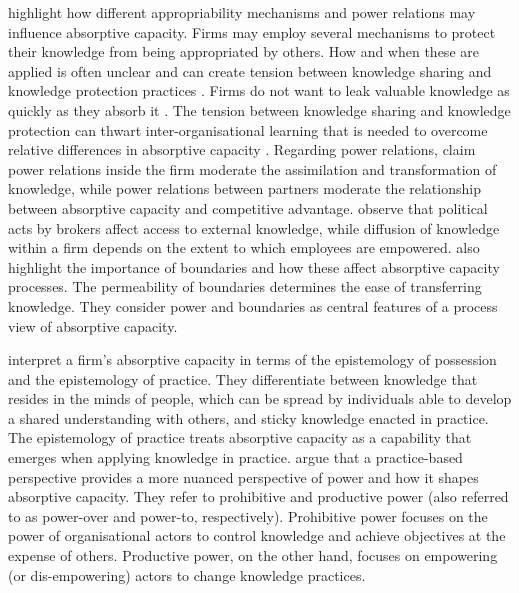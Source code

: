 \citet{todorova2007absorptive} highlight how different appropriability mechanisms and power relations may influence absorptive capacity.  Firms may employ several mechanisms to protect their knowledge from being appropriated by others. How and when these are applied is often unclear and can create tension between knowledge sharing and knowledge protection practices \citep{gama2019managing}. Firms do not want to leak valuable knowledge as quickly as they absorb it \citep{todorova2007absorptive}. The tension between knowledge sharing and knowledge protection can thwart inter-organisational learning that is needed to overcome relative differences in absorptive capacity \citep{dragsdahl2019perspective,gama2019managing}. Regarding power relations, \citet{todorova2007absorptive} claim power relations inside the firm moderate the assimilation and transformation of knowledge, while power relations between partners moderate the relationship between absorptive capacity and competitive advantage.  \citet{easterby2008absorptive} observe that political acts by brokers affect access to external knowledge, while diffusion of knowledge within a firm depends on the extent to which employees are empowered. \citet{easterby2008absorptive} also highlight the importance of boundaries and how these affect absorptive capacity processes. The permeability of boundaries determines the ease of transferring knowledge. They consider power and boundaries as central features of a process view of absorptive capacity. \medskip

\citet{marabelli2014knowing} interpret a firm's absorptive capacity in terms of the epistemology of possession and the epistemology of practice. They differentiate between knowledge that resides in the minds of people, which can be spread by individuals able to develop a shared understanding with others, and sticky knowledge enacted in practice. The epistemology of practice treats absorptive capacity as a capability that emerges when applying knowledge in practice. \citet{marabelli2014knowing} argue that a practice-based perspective provides a more nuanced perspective of power and how it shapes absorptive capacity. They refer to prohibitive and productive power (also referred to as power-over and power-to, respectively). Prohibitive power focuses on the power of organisational actors to control knowledge and achieve objectives at the expense of others. Productive power, on the other hand, focuses on empowering (or dis-empowering) actors to change knowledge practices. \medskip

